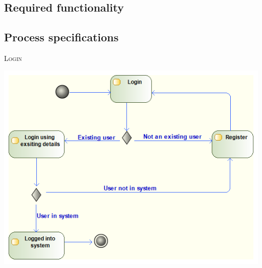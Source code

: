 \documentclass[11pt]{article}
\begin{document}
\subsection{Required functionality}

\newpage

\subsection{Process specifications}

\textsc{Login}
\begin{center} 
	\includegraphics[width=\textwidth]{../Images/Login_Activity_Diagram.png}\\[0.5cm]
\end{center}
\end{document}
